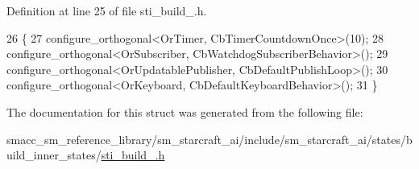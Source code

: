 Definition at line 25 of file sti\+\_\+build\+\_.\+h.


\begin{DoxyCode}
26   \{
27     configure\_orthogonal<OrTimer, CbTimerCountdownOnce>(10);
28     configure\_orthogonal<OrSubscriber, CbWatchdogSubscriberBehavior>();
29     configure\_orthogonal<OrUpdatablePublisher, CbDefaultPublishLoop>();
30     configure\_orthogonal<OrKeyboard, CbDefaultKeyboardBehavior>();
31   \}
\end{DoxyCode}


The documentation for this struct was generated from the following file\+:\begin{DoxyCompactItemize}
\item 
smacc\+\_\+sm\+\_\+reference\+\_\+library/sm\+\_\+starcraft\+\_\+ai/include/sm\+\_\+starcraft\+\_\+ai/states/build\+\_\+inner\+\_\+states/\hyperlink{sti__build__3_8h}{sti\+\_\+build\+\_.\+h}\end{DoxyCompactItemize}
